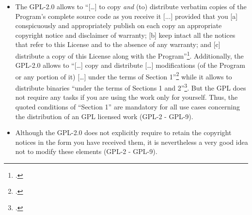 \begin{itemize}
  
  \item The GPL-2.0 allows to \enquote{[\ldots] to copy \emph{and} (to)
  distribute verbatim copies of the Program's complete source code as you
  receive it [...] provided that you [a] conspicuously and appropriately publish
  on each copy an appropriate copyright notice and disclaimer of warranty; [b]
  keep intact all the notices that refer to this License and to the absence of
  any warranty; and [c] distribute a copy of this License along with the
  Program}\footcite[cf.][\nopage wp.\ §1, emphasizes by
  KR]{Gpl20OsiLicense1991a}. Additionally, the GPL-2.0 allows to
  \enquote{[\ldots] copy and distribute [\ldots] modifications (of the Program
  or any portion of it) [\ldots] under the terms of Section
  1}\footcite[cf.][\nopage wp.\ §2]{Gpl20OsiLicense1991a} while it allows to
  distribute binaries \enquote{under the terms of Sections 1 and
  2}\footcite[cf.][\nopage wp.\ §4]{Gpl20OsiLicense1991a}. But the GPL does not
  require any tasks if you are using the work only for yourself. Thus, the
  quoted conditions of \enquote{Section 1} are mandatory for all use cases
  concerning the distribution of an GPL licensed work (GPL-2 - GPL-9).

  \item Although the GPL-2.0 does not explicitly require to retain the
  copyright notices in the form you have received them, it is nevertheless a
  very good idea not to modify these elements (GPL-2 - GPL-9).
  

\end{itemize}
